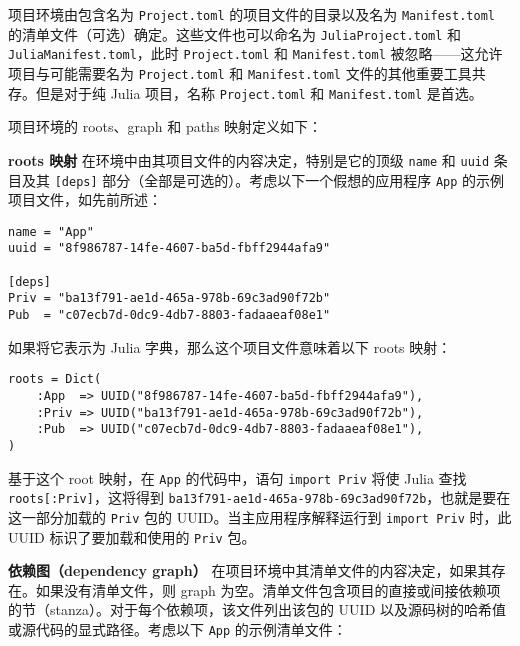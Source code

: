 项目环境由包含名为 \texttt{Project.toml} 的项目文件的目录以及名为 \texttt{Manifest.toml} 的清单文件（可选）确定。这些文件也可以命名为 \texttt{JuliaProject.toml} 和 \texttt{JuliaManifest.toml}，此时 \texttt{Project.toml} 和 \texttt{Manifest.toml} 被忽略——这允许项目与可能需要名为 \texttt{Project.toml} 和 \texttt{Manifest.toml} 文件的其他重要工具共存。但是对于纯 Julia 项目，名称 \texttt{Project.toml} 和 \texttt{Manifest.toml} 是首选。



项目环境的 roots、graph 和 paths 映射定义如下：



\textbf{roots 映射} 在环境中由其项目文件的内容决定，特别是它的顶级 \texttt{name} 和 \texttt{uuid} 条目及其 \texttt{[deps]} 部分（全部是可选的）。考虑以下一个假想的应用程序 \texttt{App} 的示例项目文件，如先前所述：




\begin{lstlisting}
name = "App"
uuid = "8f986787-14fe-4607-ba5d-fbff2944afa9"

[deps]
Priv = "ba13f791-ae1d-465a-978b-69c3ad90f72b"
Pub  = "c07ecb7d-0dc9-4db7-8803-fadaaeaf08e1"
\end{lstlisting}



如果将它表示为 Julia 字典，那么这个项目文件意味着以下 roots 映射：




\begin{verbatim}
roots = Dict(
    :App  => UUID("8f986787-14fe-4607-ba5d-fbff2944afa9"),
    :Priv => UUID("ba13f791-ae1d-465a-978b-69c3ad90f72b"),
    :Pub  => UUID("c07ecb7d-0dc9-4db7-8803-fadaaeaf08e1"),
)
\end{verbatim}



基于这个 root 映射，在 \texttt{App} 的代码中，语句 \texttt{import Priv} 将使 Julia 查找 \texttt{roots[:Priv]}，这将得到 \texttt{ba13f791-ae1d-465a-978b-69c3ad90f72b}，也就是要在这一部分加载的 \texttt{Priv} 包的 UUID。当主应用程序解释运行到 \texttt{import Priv} 时，此 UUID 标识了要加载和使用的 \texttt{Priv} 包。



\textbf{依赖图（dependency graph）} 在项目环境中其清单文件的内容决定，如果其存在。如果没有清单文件，则 graph 为空。清单文件包含项目的直接或间接依赖项的节（stanza）。对于每个依赖项，该文件列出该包的 UUID 以及源码树的哈希值或源代码的显式路径。考虑以下 \texttt{App} 的示例清单文件：




